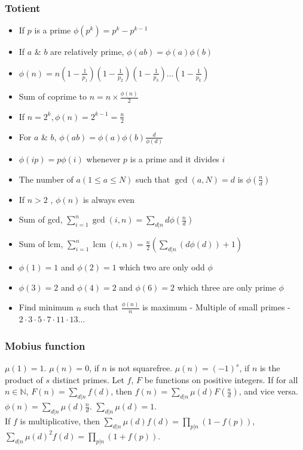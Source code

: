 \subsubsection{Totient}
\begin{itemize}
  \item If \( p \) is a prime \( \phi(p^k) = p^k - p^{k-1} \)
  \item If \( a \) \& \( b \) are relatively prime, \( \phi(ab) = \phi(a)\phi(b) \)
  \item \( \phi(n) = n(1-\frac{1}{p_1})(1-\frac{1}{p_2})(1-\frac{1}{p_3})\dots(1-\frac{1}{p_k}) \)
  \item Sum of coprime to \( n = n \times \frac{\phi(n)}{2} \)
  \item If \( n = 2^k, \phi(n) = 2^{k - 1} = \frac{n}{2} \)
  \item For \( a \) \& \( b \), \( \phi(ab) = \phi(a)\phi(b)\frac{d}{\phi(d)} \)
  \item \( \phi (ip) = p \phi(i) \) whenever \( p \) is a prime and it divides \( i \)
  \item The number of \( a (1 \le a \le N) \) such that \( \gcd(a, N)=d \) is \( \phi(\frac{n}{d}) \)
  \item If \( n > 2 \) , \( \phi(n) \) is always even
  \item Sum of gcd, \( \sum_{i=1}^n \gcd(i, n) = \sum_{d|n} d \phi(\frac{n}{d}) \)
  \item Sum of lcm, \( \sum_{i=1}^{n}\operatorname{lcm}(i, n) = \frac{n}{2}(\sum_{d|n}(d \phi(d))+1) \)
  \item \( \phi(1) = 1 \) and \( \phi(2) = 1 \) which two are only odd \( \phi \)
  \item \( \phi(3) = 2 \) and \( \phi(4) = 2 \) and \( \phi(6) = 2 \) which three are only prime \( \phi \)
  \item Find minimum $n$ such that $ \frac{\phi(n)} {n} $ is  maximum - Multiple of small primes - $ 2 \cdot 3 \cdot 5 \cdot 7 \cdot 11 \cdot 13 \dots $
\end{itemize}

\subsubsection{Mobius function}
$\mu(1) = 1$. $\mu(n) = 0$, if $n$ is not squarefree.
$\mu(n) = (-1)^s$, if $n$ is the product of $s$ distinct primes.
Let $f$, $F$ be functions on positive integers.
If for all $n \in \mathbb{N}$, $F(n)=\sum_{d|n} f(d)$, then $f(n) = \sum_{d|n} \mu(d) F(\frac{n}{d})$,
and vice versa. \quad
$\phi(n) = \sum_{d|n} \mu(d) \frac{n}{d}$.
\quad $\sum_{d|n} \mu(d) = 1$. \\
If $f$ is multiplicative, then $\sum_{d|n} \mu(d) f(d) = \prod_{p|n}(1-f(p))$,
$\sum_{d|n} \mu(d)^2 f(d) = \prod_{p|n} (1+f(p))$.

